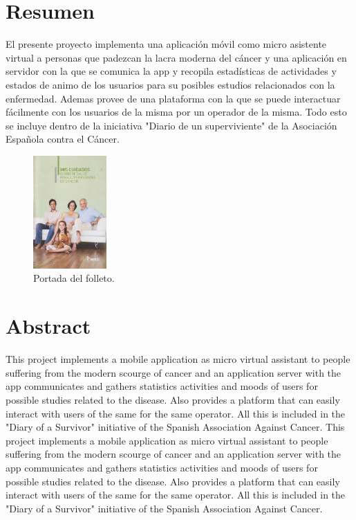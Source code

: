 \documentclass[b5paper,10pt,twoside]{book}
\begin{document}
	\chapter*{Resumen}
	 	El presente proyecto implementa una aplicación móvil como micro asistente virtual a personas que padezcan la lacra moderna del cáncer y una aplicación en servidor con la que se comunica la app y recopila estadísticas de actividades y estados de animo de los usuarios para su posibles estudios relacionados con la enfermedad. Ademas provee de una plataforma con la que se puede interactuar fácilmente con los usuarios de la misma por un operador de la misma. Todo esto se incluye dentro de la iniciativa "Diario de un superviviente" de la Asociación Española contra el Cáncer.\\
	 	
	\begin{figure}[h]
		\centering
		\includegraphics[width=0.25\textwidth]{fotointro}
		\caption{Portada del folleto.}
		\label{fig:mesh1}
	\end{figure}
	 
	\chapter*{Abstract}
	 	This project implements a mobile application as micro virtual assistant to people suffering from the modern scourge of cancer and an application server with the app communicates and gathers statistics activities and moods of users for possible studies related to the disease. Also provides a platform that can easily interact with users of the same for the same operator. All this is included in the "Diary of a Survivor" initiative of the Spanish Association Against Cancer. This project implements a mobile application as micro virtual assistant to people suffering from the modern scourge of cancer and an application server with the app communicates and gathers statistics activities and moods of users for possible studies related to the disease. Also provides a platform that can easily interact with users of the same for the same operator. All this is included in the "Diary of a Survivor" initiative of the Spanish Association Against Cancer.\cite{SHAREESP}
	
\end{document}

